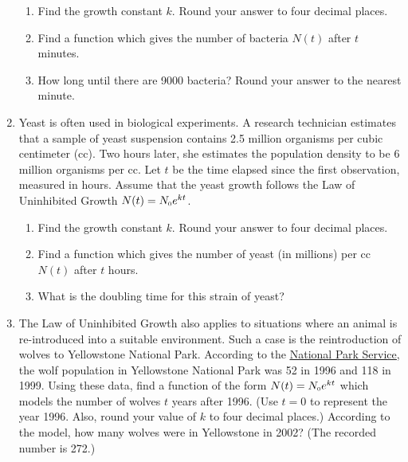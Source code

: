 \documentclass{ximera}
\begin{document}
\begin{enumerate}
\begin{enumerate}

\item  Find the growth constant $k$. Round your answer to four decimal places.

\item  Find a function which gives the number of bacteria $N(t)$ after $t$ minutes.

\item  How long until there are 9000 bacteria?  Round your answer to the nearest minute.

\end{enumerate}

\item  Yeast is often used in biological experiments.  A research technician estimates that a sample of yeast suspension contains 2.5 million organisms per cubic centimeter (cc).  Two hours later, she estimates the population density to be 6 million organisms per cc.  Let $t$ be the time elapsed since the first observation, measured in hours.  Assume that the yeast growth follows the Law of Uninhibited Growth $N(t) = N_{\text{\tiny $0$}} e^{kt}$.

\begin{enumerate}

\item  Find the growth constant $k$. Round your answer to four decimal places.

\item  Find a function which gives the number of yeast (in millions) per cc $N(t)$ after $t$ hours.

\item  What is the doubling time for this strain of yeast?

\end{enumerate}


\item  The Law of Uninhibited Growth also applies to situations where an animal is re-introduced into a suitable environment.  Such a case is the reintroduction of wolves to Yellowstone National Park.   According to the \href{http://www.nps.gov/yell/naturescience/wolves.htm}{\underline{National Park Service}}, the wolf population in Yellowstone National Park was 52 in 1996 and 118 in 1999.  Using these data, find a function of the form $N(t) = N_{\text{\tiny $0$}} e^{kt}$  which models the number of wolves $t$ years after 1996.  (Use $t = 0$ to represent the year 1996.  Also, round your value of $k$ to four decimal places.)  According to the model, how many wolves were in Yellowstone in 2002?  (The recorded number is 272.)


\end{enumerate}
\end{document}
